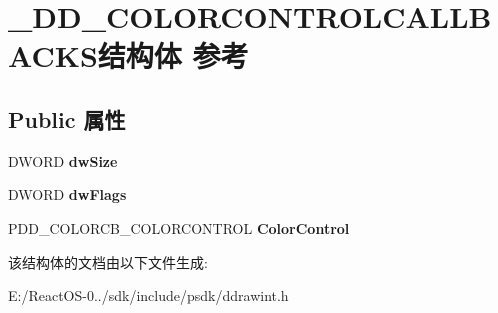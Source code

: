 \hypertarget{struct___d_d___c_o_l_o_r_c_o_n_t_r_o_l_c_a_l_l_b_a_c_k_s}{}\section{\+\_\+\+D\+D\+\_\+\+C\+O\+L\+O\+R\+C\+O\+N\+T\+R\+O\+L\+C\+A\+L\+L\+B\+A\+C\+K\+S结构体 参考}
\label{struct___d_d___c_o_l_o_r_c_o_n_t_r_o_l_c_a_l_l_b_a_c_k_s}
\subsection*{Public 属性}
\begin{DoxyCompactItemize}
\item 
\mbox{\label{struct___d_d___c_o_l_o_r_c_o_n_t_r_o_l_c_a_l_l_b_a_c_k_s_a7a06e0f5337ee31fc56951c0dd05b06f}} 
D\+W\+O\+RD {\bfseries dw\+Size}
\item 
\mbox{\label{struct___d_d___c_o_l_o_r_c_o_n_t_r_o_l_c_a_l_l_b_a_c_k_s_a59af6f9ff0d979c87a58151c28280992}} 
D\+W\+O\+RD {\bfseries dw\+Flags}
\item 
\mbox{\label{struct___d_d___c_o_l_o_r_c_o_n_t_r_o_l_c_a_l_l_b_a_c_k_s_ae91d129e08651163f40c197d1cb9e6ee}} 
P\+D\+D\+\_\+\+C\+O\+L\+O\+R\+C\+B\+\_\+\+C\+O\+L\+O\+R\+C\+O\+N\+T\+R\+OL {\bfseries Color\+Control}
\end{DoxyCompactItemize}


该结构体的文档由以下文件生成\+:\begin{DoxyCompactItemize}
\item 
E\+:/\+React\+O\+S-\/0../sdk/include/psdk/ddrawint.\+h\end{DoxyCompactItemize}
